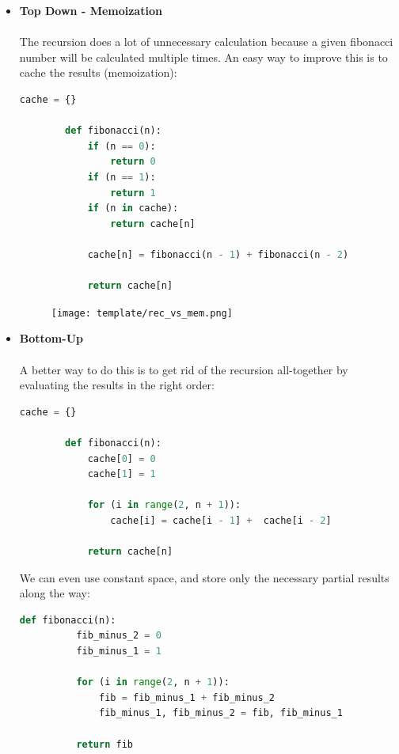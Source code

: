 \documentclass[12pt]{article}
\begin{document}
	\begin{itemize}
		\item \textbf{Top Down - Memoization} \\\\ The recursion does a lot of unnecessary calculation because a given fibonacci number will be calculated multiple times. An easy way to improve this is to cache the results (memoization):
		
		\begin{lstlisting}[language=Python]
        cache = {}

        def fibonacci(n):
            if (n == 0):
                return 0
            if (n == 1):
                return 1
            if (n in cache):
                return cache[n]
        
            cache[n] = fibonacci(n - 1) + fibonacci(n - 2)
        
            return cache[n]
        \end{lstlisting}
        
	\begin{figure}[h!]
        	\centering
        	\texttt{[image: template/rec\_vs\_mem.png]}
        	\label{fig:recursive_vs_memoization}
        \end{figure}
        
        
		\item \textbf{Bottom-Up} \\\\ A better way to do this is to get rid of the recursion all-together by evaluating the results in the right order:
		
		\begin{lstlisting}[language=Python]
        cache = {}

        def fibonacci(n):
            cache[0] = 0
            cache[1] = 1
        
            for (i in range(2, n + 1)):
                cache[i] = cache[i - 1] +  cache[i - 2]
        
            return cache[n]
        \end{lstlisting}
        We can even use constant space, and store only the necessary partial results along the way:
        
		\begin{lstlisting}[language=Python]
        def fibonacci(n):
          fib_minus_2 = 0
          fib_minus_1 = 1
        
          for (i in range(2, n + 1)):
              fib = fib_minus_1 + fib_minus_2
              fib_minus_1, fib_minus_2 = fib, fib_minus_1
        
          return fib
        \end{lstlisting}
		
	\end{itemize}
	
\end{document}
